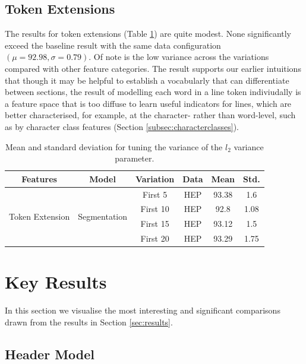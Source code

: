 \subsection{Token Extensions}
\label{subsec:tokenextensionresults}

The results for token extensions (Table \ref{table:tokenextensions}) are quite modest. None significantly exceed the baseline result with the same data configuration $(\mu = 92.98, \sigma = 0.79)$. Of note is the low variance across the variations compared with other feature categories. The result supports our earlier intuitions that though it may be helpful to establish a vocabularly that can differentiate between sections, the result of modelling each word in a line token indiviudally is a feature space that is too diffuse to learn useful indicators for lines, which are better characterised, for example, at the character- rather than word-level, such as by character class features (Section \ref{subsec:characterclasses}).

\begin{table}[h]
\begin{center}
\begin{tabular}{|c|c|c|c|c|c|}
\hline
Features & Model & Variation & Data & Mean & Std.\\
\hline
\multirow{4}{*}{Token Extension} & \multirow{4}{*}{Segmentation} & First 5 & HEP & 93.38 & 1.6\\\cline{3-6}
& & First 10 & HEP & 92.8 & 1.08\\\cline{3-6}
& & First 15 & HEP & 93.12 & 1.5\\\cline{3-6}
& & First 20 & HEP & 93.29 & 1.75\\\cline{3-6}
\hline
\end{tabular}
\caption[Mean and standard deviation for tuning the variance of the $l_2$ variance parameter.]{Mean and standard deviation for tuning the variance of the $l_2$ variance parameter.}
\label{table:tokenextensions}
\end{center}
\end{table}

\section{Key Results}

In this section we visualise the most interesting and significant comparisons drawn from the results in Section \ref{sec:results}.

\subsection{Header Model}

